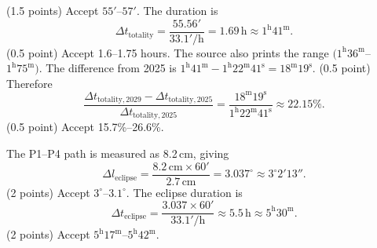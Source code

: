 \begin{description}
\[\]\hfill(1.5 points)
Accept $55'$--$57'$. The duration is
\[
\Delta t_{\mathrm{totality}}=\frac{55.56'}{33.1'/\mathrm h}=1.69\,\mathrm h\approx1^{\mathrm h}41^{\mathrm m}.
\]\hfill(0.5 point)
Accept 1.6--1.75 hours. The source also prints the range $(1^{\mathrm h}36^{\mathrm m}$--$1^{\mathrm h}75^{\mathrm m})$.
The difference from 2025 is $1^{\mathrm h}41^{\mathrm m}-1^{\mathrm h}22^{\mathrm m}41^{\mathrm s}=18^{\mathrm m}19^{\mathrm s}$. \hfill(0.5 point)
Therefore
\[
\frac{\Delta t_{\mathrm{totality},2029}-\Delta t_{\mathrm{totality},2025}}{\Delta t_{\mathrm{totality},2025}}
=\frac{18^{\mathrm m}19^{\mathrm s}}{1^{\mathrm h}22^{\mathrm m}41^{\mathrm s}}\approx22.15\%.
\]\hfill(0.5 point)
Accept 15.7\%--26.6\%.
\item[(g)] The P1--P4 path is measured as 8.2\,cm, giving
\[
\Delta l_{\mathrm{eclipse}}=\frac{8.2\,\mathrm{cm}\times60'}{2.7\,\mathrm{cm}}=3.037^\circ\approx3^\circ2'13''.
\]\hfill(2 points)
Accept $3^\circ$--$3.1^\circ$. The eclipse duration is
\[
\Delta t_{\mathrm{eclipse}}=\frac{3.037\times60'}{33.1'/\mathrm h}\approx5.5\,\mathrm h\approx5^{\mathrm h}30^{\mathrm m}.
\]\hfill(2 points)
Accept $5^{\mathrm h}17^{\mathrm m}$--$5^{\mathrm h}42^{\mathrm m}$.
\end{description}
